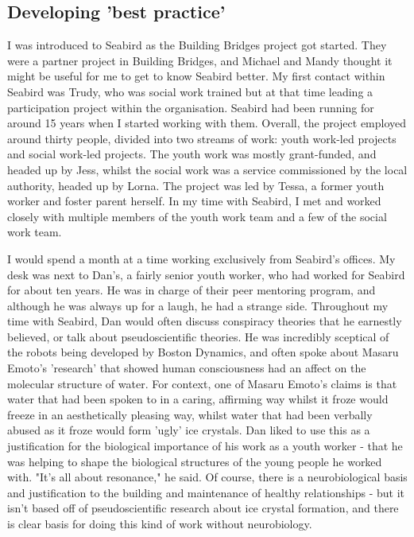 \subsection{Developing 'best practice'}
I was introduced to Seabird as the Building Bridges project got started. They were a partner project in Building Bridges, and Michael and Mandy thought it might be useful for me to get to know Seabird better. My first contact within Seabird was Trudy, who was social work trained but at that time leading a participation project within the organisation. Seabird had been running for around 15 years when I started working with them. Overall, the project employed around thirty people, divided into two streams of work: youth work-led projects and social work-led projects. The youth work was mostly grant-funded, and headed up by Jess, whilst the social work was a service commissioned by the local authority, headed up by Lorna. The project was led by Tessa, a former youth worker and foster parent herself. In my time with Seabird, I met and worked closely with multiple members of the youth work team and a few of the social work team. 

I would spend a month at a time working exclusively from Seabird's offices. My desk was next to Dan's, a fairly senior youth worker,  who had worked for Seabird for about ten years. He was in charge of their peer mentoring program, and although he was always up for a laugh, he had a strange side. Throughout my time with Seabird, Dan would often discuss conspiracy theories that he earnestly believed, or talk about pseudoscientific theories. He was incredibly sceptical of the robots being developed by Boston Dynamics, and often spoke about Masaru Emoto's 'research' that showed human consciousness had an affect on the molecular structure of water. For context, one of Masaru Emoto's claims is that water that had been spoken to in a caring, affirming way whilst it froze would freeze in an aesthetically pleasing way, whilst water that had been verbally abused as it froze would form 'ugly' ice crystals. Dan liked to use this as a justification for the biological importance of his work as a youth worker - that he was helping to shape the biological structures of the young people he worked with. "It's all about resonance," he said. Of course, there is a neurobiological basis and justification to the building and maintenance of healthy relationships - but it isn't based off of pseudoscientific research about ice crystal formation, and there is clear basis for doing this kind of work without neurobiology.

